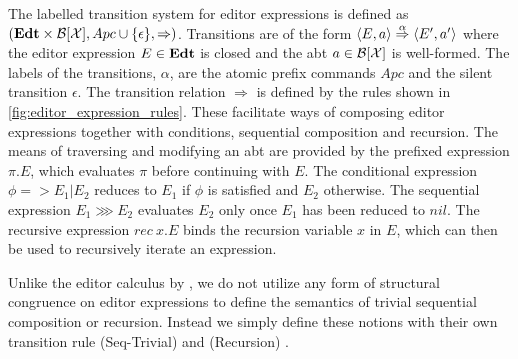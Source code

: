 \documentclass[sigplan,anonymous,review]{acmart}
\begin{document}
The labelled transition system for editor expressions is defined as
$(\textbf{Edt} \times \mathcal{B}[\mathcal{X} ], Apc \cup \{\epsilon\},
\Rightarrow)$. Transitions are of the form $\langle E, a \rangle \stackrel{\alpha}{\Rightarrow}
\langle E', a' \rangle$ where the editor expression $E \in \textbf{Edt}$ is closed and
the abt $a \in \mathcal{B}[\mathcal{X} ]$ is well-formed. The labels of the transitions,
$\alpha$, are the atomic prefix commands $Apc$ and the silent
transition $\epsilon$. The transition relation $\Rightarrow$ is
defined by the rules shown in
\cref{fig:editor_expression_rules}. These facilitate ways of composing
editor expressions together with conditions, sequential composition
and recursion. The means of traversing and modifying an abt are
provided by the prefixed expression $\pi.E$, which evaluates $\pi$
before continuing with $E$. The conditional expression $\phi =>
E_1|E_2$ reduces to $E_1$ if $\phi$ is satisfied and $E_2$
otherwise. The sequential expression $E_1 \ggg E_2$ evaluates $E_2$
only once $E_1$ has been reduced to $nil$. The recursive expression
$rec \ x.E$ binds the recursion variable $x$ in $E$, which can then be
used to recursively iterate an expression. 

Unlike the editor calculus by \cite{type_safe_structure_editor}, we do not utilize any form of structural congruence on editor expressions to define the semantics of trivial sequential composition or recursion. Instead we simply define these notions with their own transition rule (Seq-Trivial) and (Recursion)
.
\end{document}
